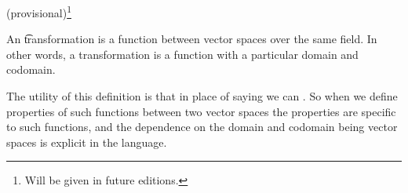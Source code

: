 

(provisional)\footnote{Will be given in future editions.}


An \t{transformation} is a function between vector spaces over the same field.
In other words, a transformation is a function with a particular domain and codomain.

The utility of this definition is that in place of saying  we can .
So when we define properties of such functions between two vector spaces the properties are specific to such functions, and the dependence on the domain and codomain being vector spaces is explicit in the language.

\blankpage
